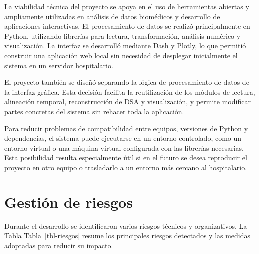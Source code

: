 \documentclass[
  spanish,
  a4paper,
  12pt,
  twoside]{memoir}
\begin{document}
La viabilidad técnica del proyecto se apoya en el uso de herramientas
abiertas y ampliamente utilizadas en análisis de datos biomédicos y
desarrollo de aplicaciones interactivas. El procesamiento de datos se
realizó principalmente en Python, utilizando librerías para lectura,
transformación, análisis numérico y visualización. La interfaz se
desarrolló mediante Dash y Plotly, lo que permitió construir una
aplicación web local sin necesidad de desplegar inicialmente el sistema
en un servidor hospitalario.

El proyecto también se diseñó separando la lógica de procesamiento de
datos de la interfaz gráfica. Esta decisión facilita la reutilización de
los módulos de lectura, alineación temporal, reconstrucción de DSA y
visualización, y permite modificar partes concretas del sistema sin
rehacer toda la aplicación.

Para reducir problemas de compatibilidad entre equipos, versiones de
Python y dependencias, el sistema puede ejecutarse en un entorno
controlado, como un entorno virtual o una máquina virtual configurada
con las librerías necesarias. Esta posibilidad resulta especialmente
útil si en el futuro se desea reproducir el proyecto en otro equipo o
trasladarlo a un entorno más cercano al hospitalario.

\chapter{Gestión de riesgos}\label{gestiuxf3n-de-riesgos}

Durante el desarrollo se identificaron varios riesgos técnicos y
organizativos. La Tabla Tabla~\ref{tbl-riesgos} resume los principales
riesgos detectados y las medidas adoptadas para reducir su impacto.
\end{document}

